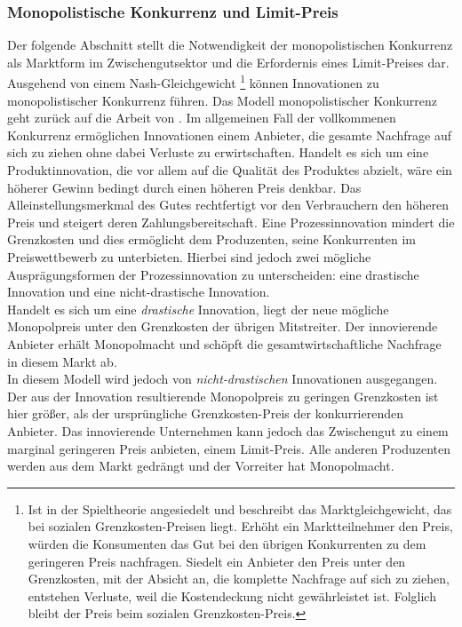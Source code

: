 \subsubsection{Monopolistische Konkurrenz und Limit-Preis}\label{sec:LimitPreis}
Der folgende Abschnitt stellt die Notwendigkeit der monopolistischen Konkurrenz als Marktform im Zwischengutsektor und die Erfordernis eines Limit-Preises dar.\\


Ausgehend von einem Nash-Gleichgewicht \footnote{Ist in der Spieltheorie angesiedelt und beschreibt das Marktgleichgewicht, das bei sozialen Grenzkosten-Preisen liegt. Erhöht ein Marktteilnehmer den Preis, würden die Konsumenten das Gut bei den übrigen Konkurrenten zu dem geringeren Preis nachfragen. Siedelt ein Anbieter den Preis unter den Grenzkosten, mit der Absicht an, die komplette Nachfrage auf sich zu ziehen, entstehen Verluste, weil die Kostendeckung nicht gewährleistet ist. Folglich bleibt der Preis beim sozialen Grenzkosten-Preis.} können Innovationen zu monopolistischer Konkurrenz führen. Das Modell monopolistischer Konkurrenz geht zurück auf die Arbeit von \citet{Dixit.1977}. Im allgemeinen Fall der vollkommenen Konkurrenz ermöglichen Innovationen einem Anbieter, die gesamte Nachfrage auf sich zu ziehen ohne dabei Verluste zu erwirtschaften. Handelt es sich um eine Produktinnovation, die vor allem auf die Qualität des Produktes abzielt, wäre ein höherer Gewinn bedingt durch einen höheren Preis denkbar. Das Alleinstellungsmerkmal des Gutes rechtfertigt vor den Verbrauchern den höheren Preis und steigert deren Zahlungsbereitschaft. Eine Prozessinnovation mindert die Grenzkosten und dies ermöglicht dem Produzenten, seine Konkurrenten im Preiswettbewerb zu unterbieten. Hierbei sind jedoch zwei mögliche Ausprägungsformen der Prozessinnovation zu unterscheiden:  eine drastische Innovation und eine nicht-drastische Innovation.\\


Handelt es sich um eine \textit{drastische} Innovation, liegt der neue mögliche Monopolpreis unter den Grenzkosten der übrigen Mitstreiter. Der innovierende Anbieter erhält Monopolmacht und schöpft die gesamtwirtschaftliche Nachfrage in diesem Markt ab.\\


In diesem Modell wird jedoch von \textit{nicht-drastischen} Innovationen ausgegangen. Der aus der Innovation resultierende Monopolpreis zu geringen Grenzkosten ist hier grö{\ss}er, als der ursprüngliche  Grenzkosten-Preis der konkurrierenden Anbieter. Das innovierende Unternehmen kann jedoch das Zwischengut zu einem marginal geringeren Preis anbieten, einem Limit-Preis. Alle anderen Produzenten werden aus dem Markt gedrängt und der Vorreiter hat Monopolmacht. \\




